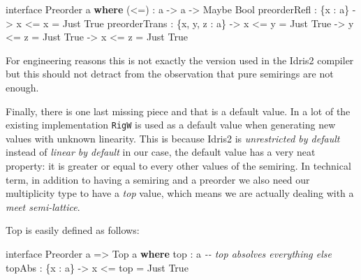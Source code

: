 \documentclass[
]{article}
\newenvironment{Shaded}{}{}
\newcommand{\CommentTok}[1]{\textcolor[rgb]{0.38,0.63,0.69}{\textit{#1}}}
\newcommand{\DataTypeTok}[1]{\textcolor[rgb]{0.56,0.13,0.00}{#1}}
\newcommand{\KeywordTok}[1]{\textcolor[rgb]{0.00,0.44,0.13}{\textbf{#1}}}
\newcommand{\NormalTok}[1]{#1}
\newcommand{\OperatorTok}[1]{\textcolor[rgb]{0.40,0.40,0.40}{#1}}
\newcommand{\OtherTok}[1]{\textcolor[rgb]{0.00,0.44,0.13}{#1}}
\begin{document}
\begin{Shaded}
\begin{Highlighting}[]
\NormalTok{interface }\DataTypeTok{Preorder}\NormalTok{ a }\KeywordTok{where}
\NormalTok{  (}\OperatorTok{\textless{}=}\NormalTok{) }\OperatorTok{:}\NormalTok{ a }\OtherTok{{-}\textgreater{}}\NormalTok{ a }\OtherTok{{-}\textgreater{}} \DataTypeTok{Maybe} \DataTypeTok{Bool}
\NormalTok{  preorderRefl }\OperatorTok{:}\NormalTok{ \{x }\OperatorTok{:}\NormalTok{ a\} }\OtherTok{{-}\textgreater{}}\NormalTok{ x }\OperatorTok{\textless{}=}\NormalTok{ x }\OtherTok{=} \DataTypeTok{Just} \DataTypeTok{True}
\NormalTok{  preorderTrans }\OperatorTok{:}\NormalTok{ \{x, y, z }\OperatorTok{:}\NormalTok{ a\} }\OtherTok{{-}\textgreater{}}\NormalTok{ x }\OperatorTok{\textless{}=}\NormalTok{ y }\OtherTok{=} \DataTypeTok{Just} \DataTypeTok{True} \OtherTok{{-}\textgreater{}}\NormalTok{ y }\OperatorTok{\textless{}=}\NormalTok{ z }\OtherTok{=} \DataTypeTok{Just} \DataTypeTok{True} \OtherTok{{-}\textgreater{}}\NormalTok{ x }\OperatorTok{\textless{}=}\NormalTok{ z }\OtherTok{=} \DataTypeTok{Just} \DataTypeTok{True}
\end{Highlighting}
\end{Shaded}

For engineering reasons this is not exactly the version used in the
Idris2 compiler but this should not detract from the observation that
pure semirings are not enough.

Finally, there is one last missing piece and that is a default value. In
a lot of the existing implementation \texttt{RigW} is used as a default
value when generating new values with unknown linearity. This is because
Idris2 is \emph{unrestricted by default} instead of \emph{linear by
default} in our case, the default value has a very neat property: it is
greater or equal to every other values of the semiring. In technical
term, in addition to having a semiring and a preorder we also need our
multiplicity type to have a \emph{top} value, which means we are
actually dealing with a \emph{meet semi-lattice}.

Top is easily defined as follows:

\begin{Shaded}
\begin{Highlighting}[]
\NormalTok{interface }\DataTypeTok{Preorder}\NormalTok{ a }\OtherTok{=\textgreater{}} \DataTypeTok{Top}\NormalTok{ a }\KeywordTok{where}
\NormalTok{  top }\OperatorTok{:}\NormalTok{ a}
  \CommentTok{{-}{-} top absolves everything else}
\NormalTok{  topAbs }\OperatorTok{:}\NormalTok{ \{x }\OperatorTok{:}\NormalTok{ a\} }\OtherTok{{-}\textgreater{}}\NormalTok{ x }\OperatorTok{\textless{}=}\NormalTok{ top }\OtherTok{=} \DataTypeTok{Just} \DataTypeTok{True}
\end{Highlighting}
\end{Shaded}
\end{document}
